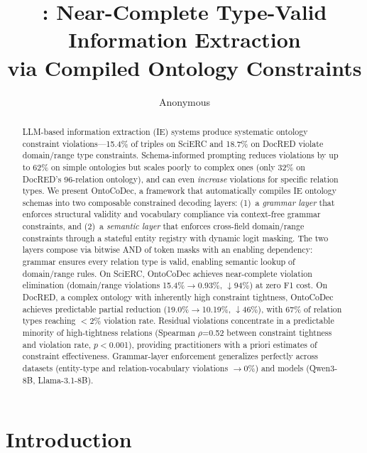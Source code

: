 \documentclass[11pt,a4paper]{article}
\title{\sys{}: Near-Complete Type-Valid Information Extraction\\via Compiled Ontology Constraints}
\author{Anonymous}
\date{}
\newcommand{\sys}{OntoCoDec}
\begin{document}
\maketitle

\begin{abstract}
LLM-based information extraction (IE) systems produce systematic ontology constraint violations---15.4\% of triples on SciERC and 18.7\% on DocRED violate domain/range type constraints.
Schema-informed prompting reduces violations by up to 62\% on simple ontologies but scales poorly to complex ones (only 32\% on DocRED's 96-relation ontology), and can even \emph{increase} violations for specific relation types.
We present \sys{}, a framework that automatically compiles IE ontology schemas into two composable constrained decoding layers: (1)~a \emph{grammar layer} that enforces structural validity and vocabulary compliance via context-free grammar constraints, and (2)~a \emph{semantic layer} that enforces cross-field domain/range constraints through a stateful entity registry with dynamic logit masking.
The two layers compose via bitwise AND of token masks with an enabling dependency: grammar ensures every relation type is valid, enabling semantic lookup of domain/range rules.
On SciERC, \sys{} achieves near-complete violation elimination (domain/range violations 15.4\%$\to$0.93\%, $\downarrow$94\%) at zero F1 cost.
On DocRED, a complex ontology with inherently high constraint tightness, \sys{} achieves predictable partial reduction (19.0\%$\to$10.19\%, $\downarrow$46\%), with 67\% of relation types reaching $<$2\% violation rate.
Residual violations concentrate in a predictable minority of high-tightness relations (Spearman $\rho$=0.52 between constraint tightness and violation rate, $p<$0.001), providing practitioners with a priori estimates of constraint effectiveness.
Grammar-layer enforcement generalizes perfectly across datasets (entity-type and relation-vocabulary violations $\to$0\%) and models (Qwen3-8B, Llama-3.1-8B).
\end{abstract}

\section{Introduction}
\end{document}
